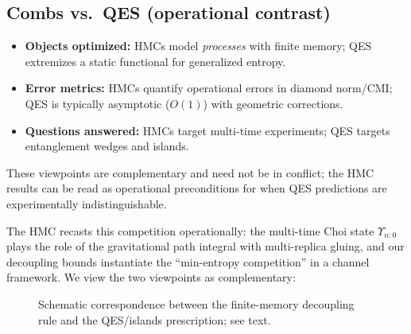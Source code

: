 \documentclass[a4paper,11pt]{article}
\newcommand{\HMC}{\textsc{HMC}\xspace}
\theoremstyle{plain}
\theoremstyle{definition}
\theoremstyle{remark}
\begin{document}
\subsection{Combs vs.\ QES (operational contrast)}
\label{app:comb-vs-qes}
\begin{itemize}[leftmargin=*,itemsep=0.25em]
  \item \textbf{Objects optimized:} \HMC{}s model \emph{processes} with finite memory; QES extremizes a static functional for generalized entropy.
  \item \textbf{Error metrics:} \HMC{}s quantify operational errors in diamond norm/CMI; QES is typically asymptotic ($O(1)$) with geometric corrections.
  \item \textbf{Questions answered:} \HMC{}s target multi-time experiments; QES targets entanglement wedges and islands.
\end{itemize}
These viewpoints are complementary and need not be in conflict; the \HMC{} results can be read as operational preconditions for when QES predictions are experimentally indistinguishable.


The \HMC{} recasts this competition operationally:
the multi-time Choi state $\Upsilon_{n{:}0}$ plays the role of the gravitational path integral with multi-replica gluing,
and our decoupling bounds instantiate the ``min-entropy competition'' in a channel framework.
We view the two viewpoints as complementary:

\begin{figure}[t]
\centering
{}
\caption{Schematic correspondence between the finite-memory decoupling rule and the QES/islands prescription; see text.}
\label{fig:decoupling-qes}
\end{figure}
\end{document}
